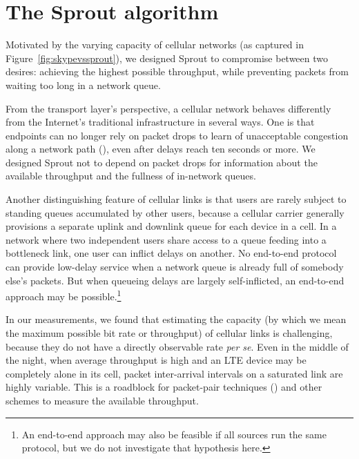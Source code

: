 \section{The Sprout algorithm}
\label{s:sprout}

Motivated by the varying capacity of cellular networks (as captured in
Figure~\ref{fig:skypevssprout}), we designed Sprout to compromise
between two desires: achieving the highest possible throughput, while
preventing packets from waiting too long in a network queue.

From the transport layer's perspective, a cellular network behaves
differently from the Internet's traditional infrastructure in several
ways. One is that endpoints can no longer rely on packet drops to
learn of unacceptable congestion along a network path
(\cite{bufferbloat}), even after delays reach ten seconds or more. We
designed Sprout not to depend on packet drops for information about
the available throughput and the fullness of in-network queues.

Another distinguishing feature of cellular links is that users are
rarely subject to standing queues accumulated by other users, because
a cellular carrier generally provisions a separate uplink and downlink
queue for each device in a cell. In a network where two independent
users share access to a queue feeding into a bottleneck link, one user
can inflict delays on another. No end-to-end protocol can provide
low-delay service when a network queue is already full of somebody
else's packets. But when queueing delays are largely self-inflicted,
an end-to-end approach may be possible.\footnote{An end-to-end
  approach may also be feasible if all sources run the same protocol,
  but we do not investigate that hypothesis here.}

In our measurements, we found that estimating the capacity (by which
we mean the maximum possible bit rate or throughput) of cellular links
is challenging, because they do not have a directly observable rate
{\em per se}. Even in the middle of the night, when average throughput
is high and an LTE device may be completely alone in its cell, packet
inter-arrival intervals on a saturated link are highly variable. This
is a roadblock for packet-pair techniques (\cite{packetpair}) and
other schemes to measure the available throughput.

